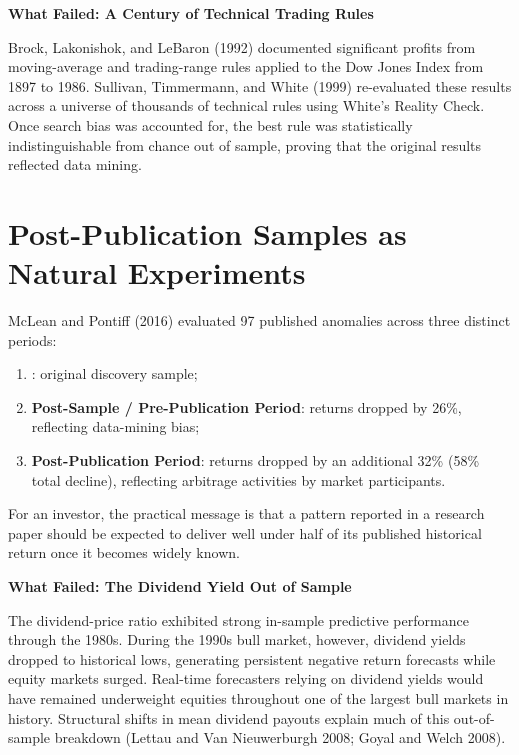 \begin{callout}
\noindent \textbf{What Failed: A Century of Technical Trading Rules}

Brock, Lakonishok, and LeBaron (1992) documented significant profits from moving-average and trading-range rules applied to the Dow Jones Index from 1897 to 1986. Sullivan, Timmermann, and White (1999) re-evaluated these results across a universe of thousands of technical rules using White's Reality Check. Once search bias was accounted for, the best rule was statistically indistinguishable from chance out of sample, proving that the original results reflected data mining.
\end{callout}

\section{Post-Publication Samples as Natural Experiments}
\label{sec:09-postpub}

McLean and Pontiff (2016) evaluated 97 published anomalies across three distinct periods:
\begin{enumerate}
  \item {}: original discovery sample;
  \item \textbf{Post-Sample / Pre-Publication Period}: returns dropped by 26\%, reflecting data-mining bias;
  \item \textbf{Post-Publication Period}: returns dropped by an additional 32\% (58\% total decline), reflecting arbitrage activities by market participants.
\end{enumerate}
For an investor, the practical message is that a pattern reported in a research paper should be expected to deliver well under half of its published historical return once it becomes widely known.

\begin{callout}
\noindent \textbf{What Failed: The Dividend Yield Out of Sample}

The dividend-price ratio exhibited strong in-sample predictive performance through the 1980s. During the 1990s bull market, however, dividend yields dropped to historical lows, generating persistent negative return forecasts while equity markets surged. Real-time forecasters relying on dividend yields would have remained underweight equities throughout one of the largest bull markets in history. Structural shifts in mean dividend payouts explain much of this out-of-sample breakdown (Lettau and Van Nieuwerburgh 2008; Goyal and Welch 2008).
\end{callout}


